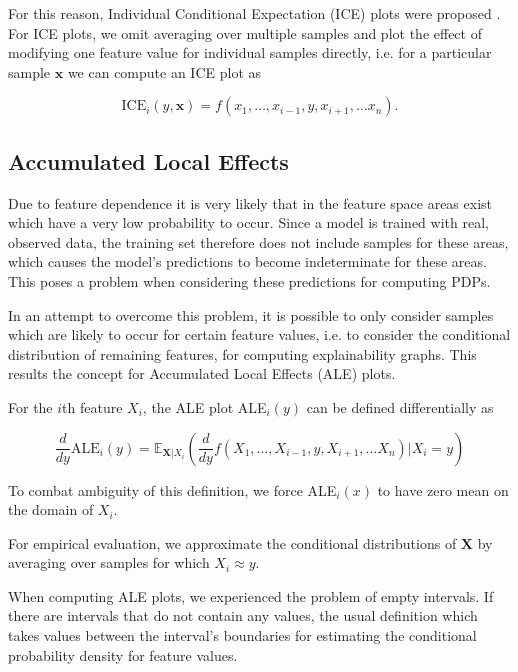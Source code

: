 \documentclass[sigconf,nonacm]{acmart}
\begin{document}
For this reason, Individual Conditional Expectation (ICE) plots were proposed \cite{goldstein2015peeking}. For ICE plots, we omit averaging over multiple samples and plot the effect of modifying one feature value for  individual samples directly, i.e. for a particular sample $\boldsymbol x$ we can compute an ICE plot as

\begin{equation}
\text{ICE}_i(y, \boldsymbol x) = f(x_1,\ldots,x_{i-1},y,x_{i+1},\ldots x_n).
\end{equation}

\subsection{Accumulated Local Effects}
Due to feature dependence it is very likely that in the feature space areas exist which have a very low probability to occur. Since a model is trained with real, observed data, the training set therefore does not include samples for these areas, which causes the model's predictions to become indeterminate for these areas. This poses a problem when considering these predictions for computing PDPs. 

In an attempt to overcome this problem, it is possible to only consider samples which are likely to occur for certain feature values, i.e. to consider the conditional distribution of remaining features, for computing explainability graphs. This results the concept for Accumulated Local Effects (ALE) plots. 

For the $i$th feature $X_i$, the ALE plot ALE$_i(y)$ can be defined differentially as



\begin{equation}
\frac{d}{dy} \text{ALE}_i (y) = \mathbb E_{\boldsymbol X | X_i}\left(\frac{d}{dy} f(X_1,\ldots,X_{i-1},y,X_{i+1},\ldots X_n) | X_i=y\right)
\end{equation}

To combat ambiguity of this definition, we force ALE$_i(x)$ to have zero mean on the domain of $X_i$.

For empirical evaluation, we approximate the conditional distributions of $\boldsymbol X$ by averaging over samples for which $X_i \approx y$. 

When computing ALE plots, we experienced the problem of empty intervals. If there are intervals  that do not contain any values, the usual definition which takes values between the interval's boundaries for estimating the conditional probability density for feature values. 
\end{document}

